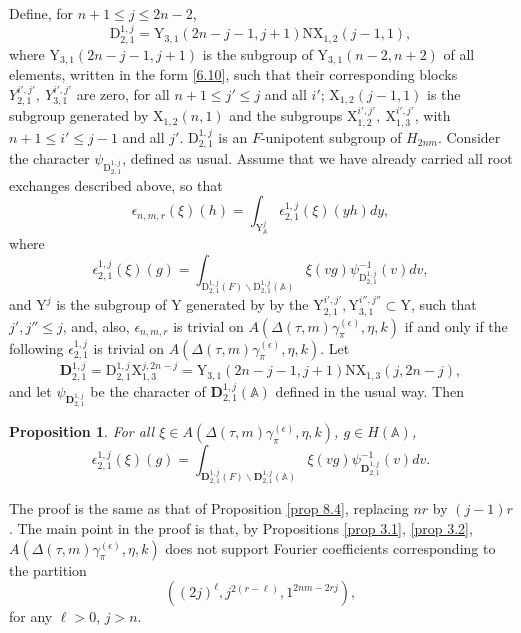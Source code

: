\documentclass[12pts]{amsart}
\newcommand{\BA}{{\mathbb {A}}}
\newtheorem{prop}[thm]{Proposition}
\begin{document}
Define, for $n+1\leq j\leq 2n-2$,
\begin{equation}\label{8.28}
\mathrm{D}_{2,1}^{1,j}=\mathrm{Y}_{3,1}(2n-j-1,j+1)\mathrm{N}\mathrm{X}_{1,2}(j-1,1),
\end{equation}
where $\mathrm{Y}_{3,1}(2n-j-1,j+1)$ is the subgroup of
$\mathrm{Y}_{3,1}(n-2,n+2)$ of all elements, written in the form
\eqref{6.10}, such that their corresponding blocks $Y_{2,1}^{i',j'},
\ Y_{3,1}^{i',j'}$ are zero, for all $n+1\leq j'\leq j$ and all
$i'$; $\mathrm{X}_{1,2}(j-1,1)$ is the subgroup generated by
$\mathrm{X}_{1,2}(n,1)$ and the subgroups
$\mathrm{X}_{1,2}^{i',j'},\ \mathrm{X}_{1,3}^{i',j'}$, with $n+1\leq
i'\leq j-1$ and all $j'$. $\mathrm{D}_{2,1}^{1,j}$ is an
$F$-unipotent subgroup of $H_{2nm}$. Consider the character
$\psi_{\mathrm{D}_{2,1}^{1,j}}$, defined as usual. Assume that we
have already carried all root exchanges described above, so that
\begin{equation}\label{8.28.1}
\epsilon_{n,m,r}(\xi)(h)=\int_{\mathrm{Y}^j_\BA}\epsilon_{2,1}^{1,j}(\xi)(yh)dy,
\end{equation}
where
\begin{equation}\label{8.29}
\epsilon_{2,1}^{1,j}(\xi)(g)=\int_{\mathrm{D}_{2,1}^{1,j}(F)\backslash
	\mathrm{D}_{2,1}^{1,j}(\BA)}\xi(vg)\psi_{\mathrm{D}_{2,1}^{1,j}}^{-1}(v)dv,
\end{equation}
and $\mathrm{Y}^j$ is the subgroup of $\mathrm{Y}$ generated by by the $\mathrm{Y}_{2,1}^{i',j'}, \mathrm{Y}_{3,1}^{i'',j''}\subset \mathrm{Y}$, such that $j',j''\leq j$, and, also, $\epsilon_{n,m,r}$ is trivial on $A(\Delta(\tau,m)\gamma_\pi^{(\epsilon)},\eta,k)$ if and only if the
following $\epsilon_{2,1}^{1,j}$ is trivial on $A(\Delta(\tau,m)\gamma_\pi^{(\epsilon)},\eta,k)$.
Let
\begin{equation}\label{8.30}
\mathbf{D}_{2,1}^{1,j}=\mathrm{D}_{2,1}^{1,j}\mathrm{X}_{1,3}^{j,2n-j}=
\mathrm{Y}_{3,1}(2n-j-1,j+1)\mathrm{N}\mathrm{X}_{1,3}(j,2n-j),
\end{equation}
and let $\psi_{\mathbf{D}_{2,1}^{1,j}}$ be the character of
$\mathbf{D}_{2,1}^{1,j}(\BA)$ defined in the usual way. Then
\begin{prop}\label{prop 8.5}
	For all $\xi\in A(\Delta(\tau,m)\gamma_\pi^{(\epsilon)},\eta,k)$, $g\in H(\BA)$,
	\begin{equation}\label{8.31}
	\epsilon_{2,1}^{1,j}(\xi)(g)=\int_{\mathbf{D}_{2,1}^{1,j}(F)\backslash
		\mathbf{D}_{2,1}^{1,j}(\BA)}\xi(vg)\psi_{\mathbf{D}_{2,1}^{1,j}}^{-1}(v)dv.
	\end{equation}
\end{prop}
The proof is the same as that of Proposition \ref{prop 8.4},
replacing $nr$ by $(j-1)r$. The main point in the proof is that, by
Propositions \ref{prop 3.1}, \ref{prop 3.2}, $A(\Delta(\tau,m)\gamma_\pi^{(\epsilon)},\eta,k)$ does not support Fourier
coefficients corresponding to the partition 
$$
((2j)^\ell,j^{2(r-\ell)},1^{2nm-2rj}), 
$$
for any $\ell>0$, $j>n$.
\end{document}
